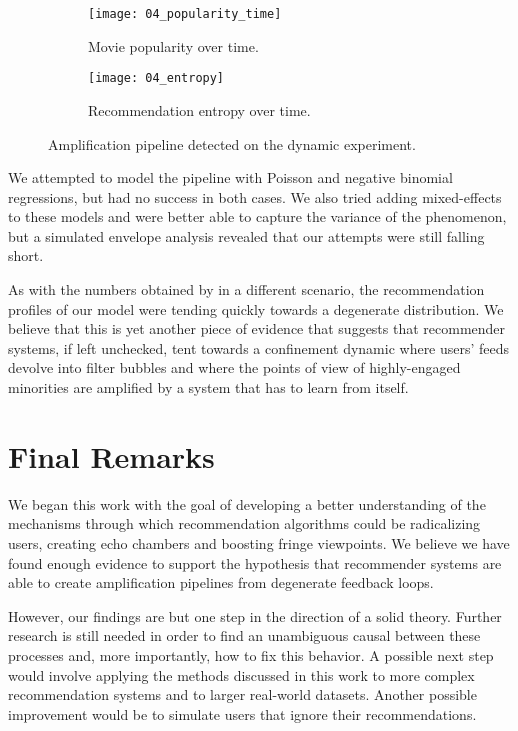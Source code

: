 \begin{figure}
  \centering
  \begin{subfigure}{0.45\textwidth}
    \centering
    \texttt{[image: 04\_popularity\_time]}
    \caption{Movie popularity over time.\label{fig:fig05_popularity_time}}
  \end{subfigure}
  \begin{subfigure}{0.45\textwidth}
    \centering
    \texttt{[image: 04\_entropy]}
    \caption{Recommendation entropy over time.\label{fig:fig05_entropy}}
  \end{subfigure}
  \caption{Amplification pipeline detected on the dynamic
  experiment.\label{fig:fig05_amplification}}
\end{figure}

We attempted to model the pipeline with Poisson and negative binomial
regressions, but had no success in both cases. We also tried adding
mixed-effects to these models and were better able to capture the variance of
the phenomenon, but a simulated envelope analysis revealed that our attempts
were still falling short.

As with the numbers obtained by \citet{} in a different scenario, the %
recommendation profiles of our model were tending quickly towards a degenerate
distribution. We believe that this is yet another piece of evidence that
suggests that recommender systems, if left unchecked, tent towards a confinement
dynamic where users' feeds devolve into filter bubbles and where the points of
view of highly-engaged minorities are amplified by a system that has to learn
from itself.

\section{Final Remarks}
\label{sec:remarks}

We began this work with the goal of developing a better understanding of the
mechanisms through which recommendation algorithms could be radicalizing users,
creating echo chambers and boosting fringe viewpoints. We believe we have found
enough evidence to support the hypothesis that recommender systems are able to
create amplification pipelines from degenerate feedback loops.

However, our findings are but one step in the direction of a solid theory.
Further research is still needed in order to find an unambiguous causal between
these processes and, more importantly, how to fix this behavior. A possible next
step would involve applying the methods discussed in this work to more complex
recommendation systems and to larger real-world datasets. Another possible
improvement would be to simulate users that ignore their recommendations.
